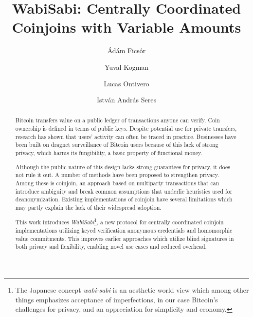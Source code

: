 \documentclass[a4paper]{article}
\begin{document}
\title{WabiSabi: Centrally Coordinated Coinjoins with Variable Amounts}
\author[1]{Ádám Ficsór}
\author[1]{Yuval Kogman}
\author[1]{Lucas Ontivero}
\author[2]{István András Seres}
\date{}
\maketitle

\begin{abstract}
Bitcoin transfers value on a public ledger of transactions anyone can verify. Coin ownership is defined in terms of public keys.
Despite potential use for private transfers, research has shown that users' activity can often be traced in practice. Businesses have been built on dragnet surveillance of Bitcoin users because of this lack of strong privacy, which harms its fungibility, a basic property of functional money.

Although the public nature of this design lacks strong guarantees for privacy, it does not rule it out.
A number of methods have been proposed to strengthen privacy. Among these is coinjoin, an approach based on multiparty transactions that can introduce ambiguity and break common assumptions that underlie heuristics used for deanonymization.
Existing implementations of coinjoin have several limitations which may partly explain the lack of their widespread adoption.

This work introduces \emph{WabiSabi}\footnote{The Japanese concept \emph{wabi-sabi} is an aesthetic world view which among other things emphasizes acceptance of imperfections, in our case Bitcoin's challenges for privacy, and an appreciation for simplicity and economy.}, a new protocol for centrally coordinated coinjoin implementations utilizing keyed verification anonymous credentials and homomorphic value commitments. This improves earlier approaches which utilize blind signatures in both privacy and flexibility, enabling novel use cases and reduced overhead.
\end{abstract}
\end{document}
